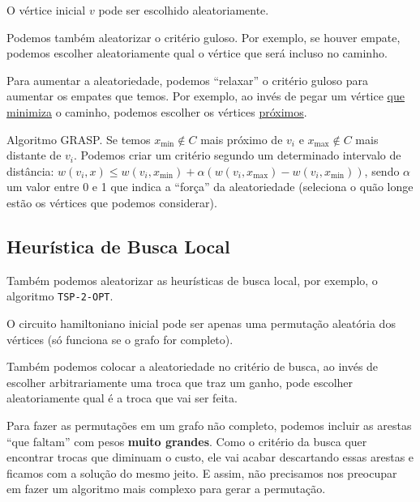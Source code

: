 \begin{algorithm}
    \SetAlgoLined
\end{algorithm}

O vértice inicial $v$ pode ser escolhido aleatoriamente.

Podemos também aleatorizar o critério guloso. Por exemplo, se houver empate, podemos escolher aleatoriamente qual o vértice que será incluso no caminho.

Para aumentar a aleatoriedade, podemos ``relaxar'' o critério guloso para aumentar os empates que temos. Por exemplo, ao invés de pegar um vértice \underline{que minimiza} o caminho, podemos escolher os vértices \underline{próximos}.

Algoritmo GRASP. Se temos $x_{\min} \notin C$ mais próximo de $v_i$ e $x_{\max} \notin C$ mais distante de $v_i$. Podemos criar um critério segundo um determinado intervalo de distância: $w(v_i, x) \leq w(v_i, x_{\min}) + \alpha \left( w(v_i, x_{\max}) - w(v_i, x_{\min}) \right)$, sendo $\alpha$ um valor entre 0 e 1 que indica a ``força'' da aleatoriedade (seleciona o quão longe estão os vértices que podemos considerar).

\subsection{Heurística de Busca Local}

Também podemos aleatorizar as heurísticas de busca local, por exemplo, o algoritmo \lstinline{TSP-2-OPT}.

O circuito hamiltoniano inicial pode ser apenas uma permutação aleatória dos vértices (só funciona se o grafo for completo).

Também podemos colocar a aleatoriedade no critério de busca, ao invés de escolher arbitrariamente uma troca que traz um ganho, pode escolher aleatoriamente qual é a troca que vai ser feita.

Para fazer as permutações em um grafo não completo, podemos incluir as arestas ``que faltam'' com pesos \textbf{muito grandes}. Como o critério da busca quer encontrar trocas que diminuam o custo, ele vai acabar descartando essas arestas e ficamos com a solução do mesmo jeito. E assim, não precisamos nos preocupar em fazer um algoritmo mais complexo para gerar a permutação.
